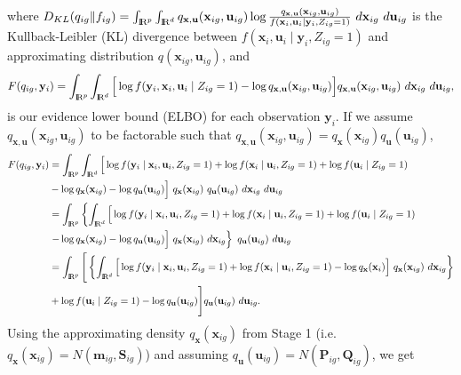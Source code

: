 \documentclass[12pt]{article}
\newcommand{\real}{\text{\rm I\hspace{-0.6mm}R}}
\newcommand{\bP}{\mathbf{P}}
\newcommand{\bmm}{\mathbf{m}}
\newcommand{\bu}{\mathbf{u}}
\newcommand{\bx}{\mathbf{x}}
\newcommand{\by}{\mathbf{y}}
\begin{document}
\noindent where $D_{KL}(q_{ig}\|f_{ig})= \int_{\real^p} \int_{\real^d} q_{\bx,\bu}(\bx_{ig},\bu_{ig}) \log \frac{q_{\bx,\bu}(\bx_{ig},\bu_{ig})}{f(\bx_{i},\bu_{i}\mid\by_i,Z_{ig}=1)} ~d\bx_{ig}~d\bu_{ig}$ is the Kullback-Leibler (KL) divergence between $f(\bx_{i},\bu_i \mid \by_i,Z_{ig}=1)$ and approximating distribution $q(\bx_{ig},\bu_{ig})$, and 
$$F(q_{ig},\by_i)=\int_{\real^p} \int_{\real^d} \Big[\log f(\by_i,\bx_i,\bu_i\mid Z_{ig}=1) - \log q_{\bx,\bu}(\bx_{ig},\bu_{ig})\Big] q_{\bx,\bu}(\bx_{ig},\bu_{ig})  ~d\bx_{ig}~d\bu_{ig},$$ is our evidence lower bound (ELBO) for each observation $\by_i$. 
If we assume $q_{\bx,\bu}(\bx_{ig},\bu_{ig})$ to be factorable such that $q_{\bx,\bu}(\bx_{ig},\bu_{ig})=q_{\bx}(\bx_{ig})q_{\bu}(\bu_{ig})$,
\begin{align*}
F(q_{ig},\by_i)&=\int_{\real^p} \int_{\real^d} \Big[ \log f(\by_i \mid \bx_i,\bu_i, Z_{ig}=1) +\log f(\bx_i\mid \bu_i,Z_{ig}=1)+\log f(\bu_i\mid Z_{ig}=1)\\
&- \log q_{\bx}(\bx_{ig}) - \log q_{\bu}(\bu_{ig}) \Big] ~q_{\bx}(\bx_{ig})~q_{\bu}(\bu_{ig})~d\bx_{ig}~d\bu_{ig}\\
&=\int_{\real^p} \left\{\int_{\real^d} \Big[ \log f(\by_i \mid \bx_i,\bu_i, Z_{ig}=1) +\log f(\bx_i\mid \bu_i,Z_{ig}=1)+ \log f(\bu_i\mid Z_{ig}=1) \right.\\
&\left.- \log q_{\bx}(\bx_{ig}) - \log q_{\bu}(\bu_{ig}) \Big] ~q_{\bx}(\bx_{ig})~d\bx_{ig} \right\} ~q_{\bu}(\bu_{ig}) ~d\bu_{ig}\\
&=\int_{\real^p} \Bigg[\left\{\int_{\real^d} \Big[ \log f(\by_i \mid \bx_i,\bu_i, Z_{ig}=1) +\log f(\bx_i\mid \bu_i,Z_{ig}=1) -\log q_\bx(\bx_i)\Big]~q_{\bx}(\bx_{ig})~d\bx_{ig} \right\}\\
&+ \log f(\bu_i\mid Z_{ig}=1)  - \log q_{\bu}(\bu_{ig}) \Bigg] q_{\bu}(\bu_{ig}) ~d\bu_{ig}.
\end{align*}
Using the approximating density $q_\bx(\bx_{ig})$ from Stage 1 (i.e. $q_\bx(\bx_{ig}) = N (\bmm_{ig},\mathbf{S}_{ig})$) and assuming $q_\bu(\bu_{ig}) = N (\bP_{ig},\mathbf{Q}_{ig})$, we get
\end{document}
